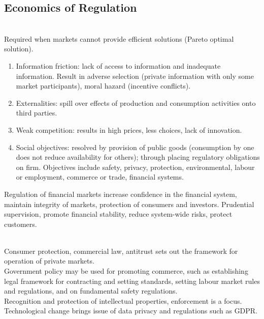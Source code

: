 \subsection{Economics of Regulation}

\begin{remark} \\
Required when markets cannot provide efficient solutions (Pareto optimal solution).
\begin{enumerate}[label=\roman*.]
\setlength{\itemsep}{0pt}
\item Information friction: lack of access to information and inadequate information. Result in adverse selection (private information with only some market participants), moral hazard (incentive conflicts). 
\item Externalities: spill over effects of production and consumption activities onto third parties.
\item Weak competition: results in high prices, less choices, lack of innovation.
\item Social objectives: resolved by provision of public goods (consumption by one does not reduce availability for others); through placing regulatory obligations on firm. Objectives include safety, privacy, protection, environmental, labour or employment, commerce or trade, financial systems.
\end{enumerate}
Regulation of financial markets increase confidence in the financial system, maintain integrity of markets, protection of consumers and investors. Prudential supervision, promote financial stability, reduce system-wide risks, protect customers.
\end{remark}

\begin{remark} \\
Consumer protection, commercial law, antitrust sets out the framework for operation of private markets.\\
Government policy may be used for promoting commerce, such as establishing legal framework for contracting and setting standards, setting labour market rules and regulations, and on fundamental safety regulations.\\
Recognition and protection of intellectual properties, enforcement is a focus.\\
Technological change brings issue of data privacy and regulations such as GDPR.
\end{remark}

